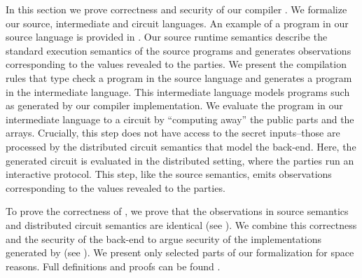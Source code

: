 In this section we prove correctness and security of our compiler \tool.
We formalize our source, intermediate and circuit languages. 
An example of a program in our source language is provided in .
Our source runtime semantics describe the standard execution semantics of the source programs and
generates observations corresponding to the values revealed to the
parties.
%
We present the compilation rules that type check a program in the source language and generates a program in the intermediate language. This intermediate language models programs such as  generated by our compiler implementation.
%
We evaluate the program in our intermediate language  to a circuit by ``computing away'' the public parts and the arrays. Crucially, this step does not have access to the secret inputs--those are processed by the distributed circuit semantics that model the \mpc back-end.
%
Here, the generated circuit is evaluated in the distributed setting, where the parties run an interactive protocol. This step, like  the source semantics, emits observations corresponding to the values revealed to the parties. 

To prove the correctness of \tool, we prove that  the observations in source semantics and distributed circuit semantics are identical (see ). 
We combine this correctness and the security of the \mpc back-end to argue security of the implementations generated by \tool (see ).
We present only selected parts of our formalization for space
reasons. Full definitions and proofs can be found \cite{anonymized}.





